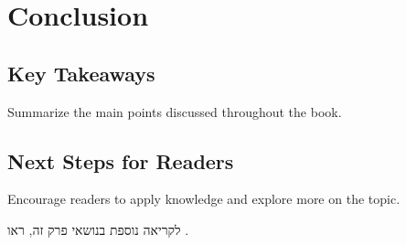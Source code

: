 \chapter{Conclusion}
\section{Key Takeaways}
Summarize the main points discussed throughout the book.

\section{Next Steps for Readers}
Encourage readers to apply knowledge and explore more on the topic.

לקריאה נוספת בנושאי פרק זה, ראו \cite{crewai_docs}.

